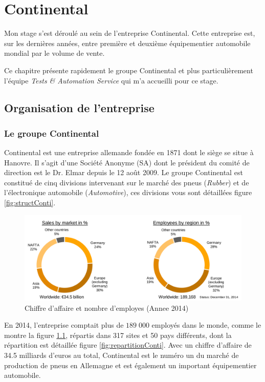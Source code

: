 \chapter{Continental}\label{chapConti}
\putminitoc
Mon stage s'est déroulé au sein de l'entreprise Continental. Cette entreprise est, sur les dernières années, entre première et deuxième équipementier automobile mondial par le volume de vente.

Ce chapitre présente rapidement le groupe Continental et plus particulièrement l'équipe \textit{Tests \& Automation Service} qui m'a accueilli pour ce stage.

	\section{Organisation de l'entreprise}
		\subsection{Le groupe Continental}

Continental est une entreprise allemande fondée en 1871 dont le siège se situe à Hanovre. Il s'agit d'une Société Anonyme (SA) dont le président du comité de
direction est le Dr. Elmar  depuis le 12 août 2009. Le groupe Continental est constitué de cinq divisions intervenant sur le marché des pneus (\textit{Rubber}) et de l'électronique automobile (\textit{Automotive}), ces divisions vous sont détaillées figure \ref{fig:structConti}.
	 
		 \begin{figure}[H]
		 	\centering
		 	\includegraphics[width=17cm]{contents/images/caConti.png}
		 	\caption[Chiffre d'affaire et nombre d'employes (Annee 2014)]{Chiffre d'affaire et nombre d'employes (Annee 2014)\footnotemark{}}
		 	\label{fig:caConti}
		 \end{figure}
		 En 2014, l'entreprise comptait plus de $189\;000$ employés dans le monde, comme le montre la figure \ref{fig:caConti}, répartis dans 317 sites et 50 pays différents, dont la répartition est détaillée figure \ref{fig:repartitionConti}. Avec un chiffre d'affaire de 34.5 milliards d'euros au total, Continental est le numéro un du marché de production de pneus en Allemagne et est également un important équipementier automobile.

